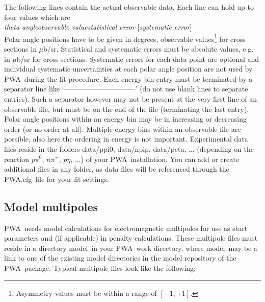 \documentclass[a4paper,10pt]{article}
\def\PWA{\ttfamily PWA\rmfamily\ }
\def\bl{\phantom{0}}
\def\tt{\ttfamily}
\def\rm{\rmfamily}
\begin{document}
The following lines contain the actual observable data. Each line can hold up to four values which are\\
\tt\textit{theta angle\bl\bl\bl\bl observable value\bl\bl\bl\bl  statistical error\bl\bl\bl\bl}
[\textit{systematic error}]\rm\\
Polar angle positions have to be given in degrees, observable values\footnote{Asymmetry values must be within a range
of $[-1,+1]$.} for cross sections in $\mu$b/sr. Statistical and systematic
errors must be absolute values, e.g. in $\mu$b/sr for cross sections.
Systematic errors for each data point are optional and individual systematic uncertainties at each polar angle position
are not used by \PWA during the fit procedure.
Each energy bin entry must be terminated by a separator line like
`\tt------------------------------\rm' (do not use blank lines to separate entries).
Such a separator however may not be present at the very first line of an observable file, but must be on the end of the file
(terminating the last entry).
Polar angle positions within an energy bin may be in increasing or decreasing order (or no order at all).
Multiple energy bins within an observable file are possible, also here the ordering in energy is not important.
Experimental data files reside in the folders \tt data/ppi0\rm, \tt data/npip\rm, 
\tt data/peta\rm, ... (depending on the reaction $p \pi^0$, $n\pi^+$, $p\eta$, ...) of your \PWA installation.
You can add or create additional files in any folder, as data files will be referenced through the 
\tt PWA.cfg\rm\ file for your fit settings.

\subsection{Model multipoles}\label{sec_models}

\PWA needs model calculations for electromagnetic multipoles for use as start parameters and (if applicable) in penalty calculations.
These multipole files must reside in a directory \tt model\rm\ in your \PWA work directory, where
\tt model\rm\ may be a link to one of the existing model directories in the model repository of the \PWA package.
Typical multipole files look like the following:\\
\end{document}

